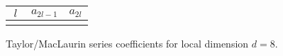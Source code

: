 \documentclass[11pt, oneside]{article}
\begin{document}
\newcommand{\dval}{8}    %
\newcommand{\ORDval}{32} %

\begin{center}
\renewcommand{\arraystretch}{1.2}
\begin{tabular}{|c|| c| c |} 
 \hline
  $\ l \ $ & $a_{2l-1}$ & $a_{2l}$  \\ [0.5ex] 
 \hline
%
\\[0.3ex]
 \hline
\end{tabular}

\bigskip

Taylor/MacLaurin series coefficients for local dimension $d = \dval$.
\end{center}
\end{document}
